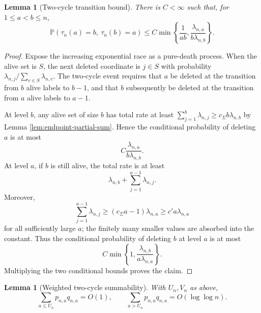 \documentclass[11pt]{article}
\newtheorem{lemma}[theorem]{Lemma}
\theoremstyle{remark}
\newcommand{\Pp}{\mathbb P}
\begin{document}
\begin{lemma}[Two-cycle transition bound]\label{lem:two-cycle-bound}
There is $C<\infty$ such that, for $1\le a<b\le n$,
\[
        \Pp(\tau_n(a)=b,\ \tau_n(b)=a)
        \le C\min\left\{\frac1{ab},
        \frac{\lambda_{n,a}}{b\lambda_{n,b}}\right\}.
\]
\end{lemma}

\begin{proof}
Expose the increasing exponential race as a pure-death process.  When the alive
set is $S$, the next deleted coordinate is $j\in S$ with probability
$\lambda_{n,j}/\sum_{c\in S}\lambda_{n,c}$.  The two-cycle event requires that
$a$ be deleted at the transition from $b$ alive labels to $b-1$, and that $b$
subsequently be deleted at the transition from $a$ alive labels to $a-1$.

At level $b$, any alive set of size $b$ has total rate at least
$\sum_{j=1}^b\lambda_{n,j}\ge c_\Sigma b\lambda_{n,b}$ by Lemma
\ref{lem:endpoint-partial-sum}.  Hence the conditional probability of deleting
$a$ is at most
\[
        C\frac{\lambda_{n,a}}{b\lambda_{n,b}}.
\]
At level $a$, if $b$ is still alive, the total rate is at least
\[
        \lambda_{n,b}+\sum_{j=1}^{a-1}\lambda_{n,j}.
\]
Moreover,
\[
        \sum_{j=1}^{a-1}\lambda_{n,j}
        \ge(c_\Sigma a-1)\lambda_{n,a}
        \ge c'a\lambda_{n,a}
\]
for all sufficiently large $a$; the finitely many smaller values are absorbed
into the constant.  Thus the conditional probability of deleting $b$ at level
$a$ is at most
\[
        C\min\left\{1,
        \frac{\lambda_{n,b}}{a\lambda_{n,a}}\right\}.
\]
Multiplying the two conditional bounds proves the claim.
\end{proof}

\begin{lemma}[Weighted two-cycle summability]\label{lem:two-cycle-sum}
With $U_n,V_n$ as above,
\[
        \sum_{a\le U_n}p_{n,a}q_{n,a}=O(1),
        \qquad
        \sum_{a>U_n}p_{n,a}q_{n,a}=O(\log\log n).
\]
\end{lemma}
\end{document}

